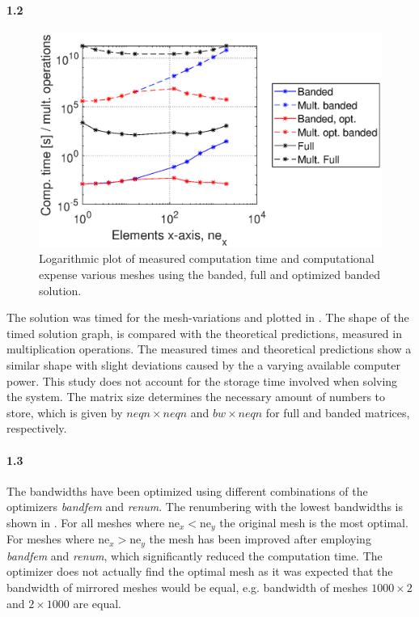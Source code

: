 \paragraph{1.2}
\begin{figure}
\flushright
    \centering
    \includegraphics[trim=.0cm .0cm .750cm .0cm, clip=true,width=1\linewidth]{Figures/Plots/ex1plot.eps}
\caption{Logarithmic plot of measured computation time and computational expense various meshes using the banded, full and optimized banded solution.}
\label{fig:ex1plot}
\end{figure}
The solution was timed for the mesh-variations and plotted  in . The shape of the timed solution graph, is compared with the theoretical predictions, measured in multiplication operations. The measured times and theoretical predictions show a similar shape with slight deviations caused by the a varying available computer power. This study does not account for the storage time involved when solving the system. The matrix size determines the necessary amount of numbers to store, which is given by $neqn \times neqn$ and $bw \times neqn$ for full and banded matrices, respectively.

\vspace{-3mm}
\paragraph{1.3}
The bandwidths have been optimized using different combinations of the optimizers \textit{bandfem} and \textit{renum}. The renumbering with the lowest bandwidths is shown in . For all meshes where $\text{ne}_x<\text{ne}_y$ the original mesh is the most optimal. For meshes where $\text{ne}_x>\text{ne}_y$ the mesh has been improved after employing \textit{bandfem} and \textit{renum}, which significantly reduced the computation time. The optimizer does not actually find the optimal mesh as it was expected that the bandwidth of mirrored meshes would be equal, e.g. bandwidth of meshes $1000 \times 2$ and $2 \times 1000$ are equal.

